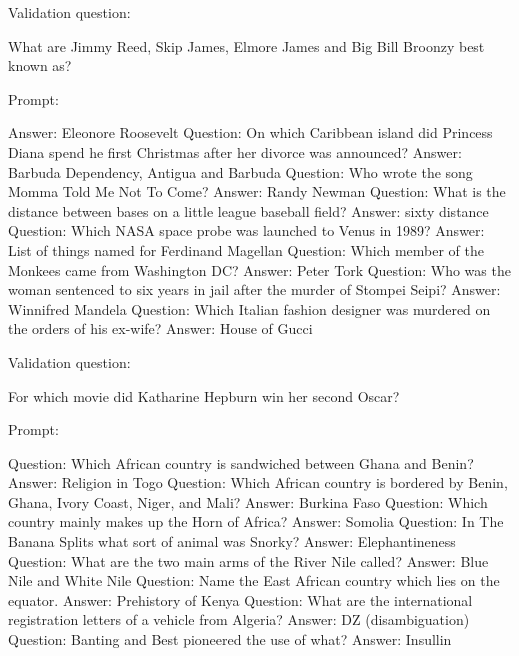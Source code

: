 Validation question:

What are Jimmy Reed, Skip James, Elmore James and Big Bill Broonzy best known as?

Prompt:

Answer: Eleonore Roosevelt
Question: On which Caribbean island did Princess Diana spend he first Christmas after her divorce was announced?
Answer: Barbuda Dependency, Antigua and Barbuda
Question: Who wrote the song Momma Told Me Not To Come?
Answer: Randy Newman
Question: What is the distance between bases on a little league baseball field?
Answer: sixty  distance
Question: Which NASA space probe was launched to Venus in 1989?
Answer: List of things named for Ferdinand Magellan
Question: Which member of the Monkees came from Washington DC?
Answer: Peter Tork
Question: Who was the woman sentenced to six years in jail after the murder of Stompei Seipi?
Answer: Winnifred Mandela
Question: Which Italian fashion designer was murdered on the orders of his ex-wife?
Answer: House of Gucci

Validation question:

For which movie did Katharine Hepburn win her second Oscar?

Prompt:

Question: Which African country is sandwiched between Ghana and Benin?
Answer: Religion in Togo
Question: Which African country is bordered by Benin, Ghana, Ivory Coast, Niger, and Mali?
Answer: Burkina Faso
Question: Which country mainly makes up the Horn of Africa?
Answer: Somolia
Question: In The Banana Splits what sort of animal was Snorky?
Answer: Elephantineness
Question: What are the two main arms of the River Nile called?
Answer: Blue Nile and White Nile
Question: Name the East African country which lies on the equator.
Answer: Prehistory of Kenya
Question: What are the international registration letters of a vehicle from Algeria?
Answer: DZ (disambiguation)
Question: Banting and Best pioneered the use of what?
Answer: Insullin
